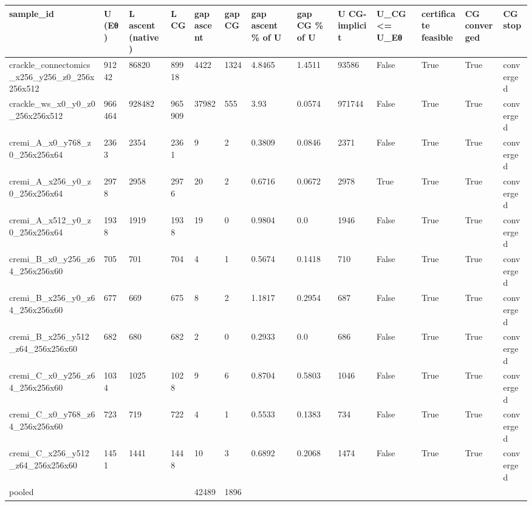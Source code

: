 \begin{tabular}{lllllllllllll}
\hline
sample\_id & U (Eθ) & L ascent (native) & L CG & gap ascent & gap CG & gap ascent \% of U & gap CG \% of U & U CG-implicit & U\_CG <= U\_Eθ & certificate feasible & CG converged & CG stop \\
\hline
crackle\_connectomics\_x256\_y256\_z0\_256x256x512 & 91242 & 86820 & 89918 & 4422 & 1324 & 4.8465 & 1.4511 & 93586 & False & True & True & converged \\
crackle\_ws\_x0\_y0\_z0\_256x256x512 & 966464 & 928482 & 965909 & 37982 & 555 & 3.93 & 0.0574 & 971744 & False & True & True & converged \\
cremi\_A\_x0\_y768\_z0\_256x256x64 & 2363 & 2354 & 2361 & 9 & 2 & 0.3809 & 0.0846 & 2371 & False & True & True & converged \\
cremi\_A\_x256\_y0\_z0\_256x256x64 & 2978 & 2958 & 2976 & 20 & 2 & 0.6716 & 0.0672 & 2978 & True & True & True & converged \\
cremi\_A\_x512\_y0\_z0\_256x256x64 & 1938 & 1919 & 1938 & 19 & 0 & 0.9804 & 0.0 & 1946 & False & True & True & converged \\
cremi\_B\_x0\_y256\_z64\_256x256x60 & 705 & 701 & 704 & 4 & 1 & 0.5674 & 0.1418 & 710 & False & True & True & converged \\
cremi\_B\_x256\_y0\_z64\_256x256x60 & 677 & 669 & 675 & 8 & 2 & 1.1817 & 0.2954 & 687 & False & True & True & converged \\
cremi\_B\_x256\_y512\_z64\_256x256x60 & 682 & 680 & 682 & 2 & 0 & 0.2933 & 0.0 & 686 & False & True & True & converged \\
cremi\_C\_x0\_y256\_z64\_256x256x60 & 1034 & 1025 & 1028 & 9 & 6 & 0.8704 & 0.5803 & 1046 & False & True & True & converged \\
cremi\_C\_x0\_y768\_z64\_256x256x60 & 723 & 719 & 722 & 4 & 1 & 0.5533 & 0.1383 & 734 & False & True & True & converged \\
cremi\_C\_x256\_y512\_z64\_256x256x60 & 1451 & 1441 & 1448 & 10 & 3 & 0.6892 & 0.2068 & 1474 & False & True & True & converged \\
pooled &  &  &  & 42489 & 1896 &  &  &  &  &  &  &  \\
\hline
\end{tabular}
